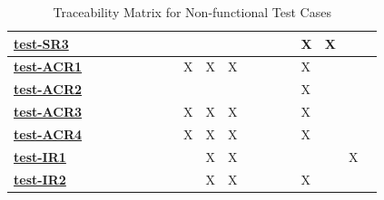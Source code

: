 \documentclass[12pt, titlepage]{article}
\begin{document}
\begin{table}[H]
\begin{adjustwidth}{-1.5in}{-1in}
{\begin{tabular}{l|l|l|l|l|l|l|l|l|l|l|l|l|l|l|l|l|l|l|}
\multicolumn{1}{|l|}{\hyperref[Test-SR3]{\textbf{test-SR3}}}  &              &              &              &              &              &              &              &              &              &              &              &              &              &              & X            & X            &              &              \\ \hline
\multicolumn{1}{|l|}{\hyperref[Test-ACR1]{\textbf{test-ACR1}}} &              &              &              &              &              &              &              & X            & X            & X            &              &              &              &              & X            &              &              &              \\ \hline
\multicolumn{1}{|l|}{\hyperref[Test-ACR2]{\textbf{test-ACR2}}} &              &              &              &              &              &              &              &              &              &              &              &              &              &              & X            &              &              &              \\ \hline
\multicolumn{1}{|l|}{\hyperref[Test-ACR3]{\textbf{test-ACR3}}} &              &              &              &              &              &              &              & X            & X            & X            &              &              &              &              & X            &              &              &              \\ \hline
\multicolumn{1}{|l|}{\hyperref[Test-ACR4]{\textbf{test-ACR4}}} &              &              &              &              &              &              &              & X            & X            & X            &              &              &              &              & X            &              &              &              \\ \hline
\multicolumn{1}{|l|}{\hyperref[Test-IR1]{\textbf{test-IR1}}}  &              &              &              &              &              &              &              &              & X            & X            &              &              &              &              &              &              & X            &              \\ \hline
\multicolumn{1}{|l|}{\hyperref[Test-IR2]{\textbf{test-IR2}}}  &              &              &              &              &              &              &              &              & X            & X            &              &              &              &              & X            &              &              &              \\ \hline
\end{tabular}
}
\caption{Traceability Matrix for Non-functional Test Cases}
    \label{table:TMNFR}
\end{adjustwidth}
\end{table}
		
\end{document}
